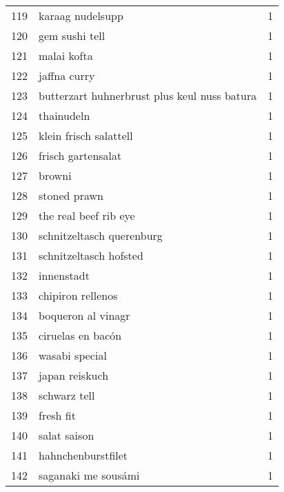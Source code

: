 \begin{tabular}{llr}
119 &                                   karaag nudelsupp &      1 \\
120 &                                     gem sushi tell &      1 \\
121 &                                        malai kofta &      1 \\
122 &                                       jaffna curry &      1 \\
123 &       butterzart huhnerbrust plus keul nuss batura &      1 \\
124 &                                         thainudeln &      1 \\
125 &                             klein frisch salattell &      1 \\
126 &                                 frisch gartensalat &      1 \\
127 &                                             browni &      1 \\
128 &                                       stoned prawn &      1 \\
129 &                              the real beef rib eye &      1 \\
130 &                          schnitzeltasch querenburg &      1 \\
131 &                             schnitzeltasch hofsted &      1 \\
132 &                                         innenstadt &      1 \\
133 &                                  chipiron rellenos &      1 \\
134 &                                 boqueron al vinagr &      1 \\
135 &                                  ciruelas en bacón &      1 \\
136 &                                     wasabi special &      1 \\
137 &                                     japan reiskuch &      1 \\
138 &                                       schwarz tell &      1 \\
139 &                                          fresh fit &      1 \\
140 &                                       salat saison &      1 \\
141 &                                 hahnchenburstfilet &      1 \\
142 &                                saganaki me sousámi &      1 \\

\end{tabular}

